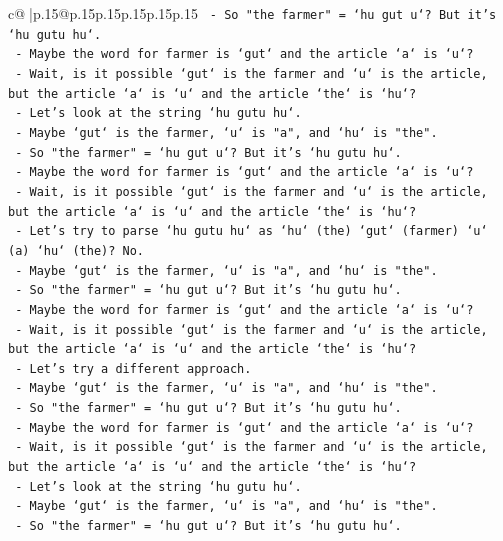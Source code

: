\documentclass{article}
\begin{document}
{\begin{supertabular}{c@{$\;$}|p{.15\linewidth}@{}p{.15\linewidth}p{.15\linewidth}p{.15\linewidth}p{.15\linewidth}p{.15\linewidth}}
{{{\texttt{   {-} So "the farmer" = `hu gut u`? But it's `hu gutu hu`.} \\
\texttt{   {-} Maybe the word for farmer is `gut` and the article `a` is `u`?} \\
\texttt{   {-} Wait, is it possible `gut` is the farmer and `u` is the article, but the article `a` is `u` and the article `the` is `hu`?} \\
\texttt{   {-} Let's look at the string `hu gutu hu`.} \\
\texttt{   {-} Maybe `gut` is the farmer, `u` is "a", and `hu` is "the".} \\
\texttt{   {-} So "the farmer" = `hu gut u`? But it's `hu gutu hu`.} \\
\texttt{   {-} Maybe the word for farmer is `gut` and the article `a` is `u`?} \\
\texttt{   {-} Wait, is it possible `gut` is the farmer and `u` is the article, but the article `a` is `u` and the article `the` is `hu`?} \\
\texttt{   {-} Let's try to parse `hu gutu hu` as `hu` (the) `gut` (farmer) `u` (a) `hu` (the)? No.} \\
\texttt{   {-} Maybe `gut` is the farmer, `u` is "a", and `hu` is "the".} \\
\texttt{   {-} So "the farmer" = `hu gut u`? But it's `hu gutu hu`.} \\
\texttt{   {-} Maybe the word for farmer is `gut` and the article `a` is `u`?} \\
\texttt{   {-} Wait, is it possible `gut` is the farmer and `u` is the article, but the article `a` is `u` and the article `the` is `hu`?} \\
\texttt{   {-} Let's try a different approach.} \\
\texttt{   {-} Maybe `gut` is the farmer, `u` is "a", and `hu` is "the".} \\
\texttt{   {-} So "the farmer" = `hu gut u`? But it's `hu gutu hu`.} \\
\texttt{   {-} Maybe the word for farmer is `gut` and the article `a` is `u`?} \\
\texttt{   {-} Wait, is it possible `gut` is the farmer and `u` is the article, but the article `a` is `u` and the article `the` is `hu`?} \\
\texttt{   {-} Let's look at the string `hu gutu hu`.} \\
\texttt{   {-} Maybe `gut` is the farmer, `u` is "a", and `hu` is "the".} \\
\texttt{   {-} So "the farmer" = `hu gut u`? But it's `hu gutu hu`.} \\
}}}
\end{supertabular}}
\end{document}
